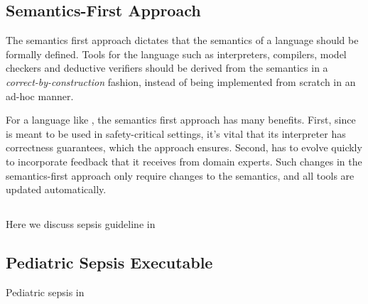 \subsection{Semantics-First Approach}\label{subsec:semantics-first}

The semantics first approach dictates that the semantics
of a language should be formally defined. Tools for the language
such as interpreters, compilers, model checkers and deductive
verifiers should be derived from the semantics in a
\emph{correct-by-construction} fashion, instead of being implemented
from scratch in an ad-hoc manner.

For a language like \MediK{}, the semantics first approach has many benefits. First,
since \MediK{} is meant to be used in safety-critical settings,
it's vital that its interpreter has correctness guarantees, which
the approach ensures. Second, \MediK{} has to evolve quickly
to incorporate feedback that it receives from domain experts.
Such changes in the semantics-first approach only require changes to
the semantics, and all tools are updated automatically.

\subsection{\MediK{}}\label{subsec:medik}
Here we discuss sepsis guideline in \MediK{}


\subsection{Pediatric Sepsis Executable \BPG{}}\label{subsec:sepsis-cdss}
Pediatric sepsis \CDSS{} in \MediK{}


